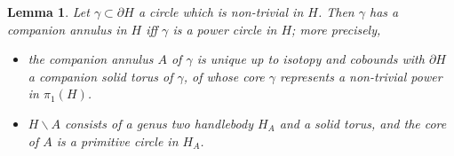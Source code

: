 \documentclass[12pt]{amsart}
\newtheorem{lema}{Lemma}
\begin{document}
\begin{lema}\label{tejano2}
Let $\gamma\subset\partial H$ a circle which is non-trivial in $H$. Then $\gamma$  has a companion annulus in $H$ iff $\gamma$ is a power circle in $H$; more precisely,
\begin{itemize}
\item the companion annulus $A$ of $\gamma$ is unique up to isotopy and cobounds with $\partial H$ a companion solid torus of $\gamma$, of whose core $\gamma$ represents a non-trivial power in $\pi_{1}(H)$.
\item $H\backslash A$ consists of  a genus two handlebody $H_{A}$ and a solid torus, and the core of $A$ is a primitive circle in $H_{A}$.


\end{itemize}
\end{lema}

 
\end{document}
